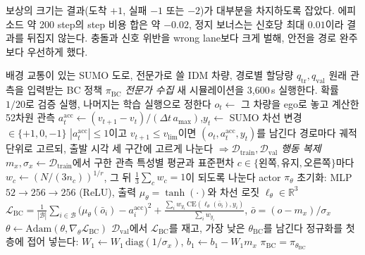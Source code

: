 \documentclass[10pt,a4paper]{article}
\newcommand{\Dtr}{\mathcal{D}_{\mathrm{train}}}
\newcommand{\Dval}{\mathcal{D}_{\mathrm{val}}}
\newcommand{\CE}{\mathrm{CE}}
\begin{document}
보상의 크기는 결과(도착 $+1$, 실패 $-1$ 또는 $-2$)가 대부분을 차지하도록 잡았다. 에피소드 약 200 step의 step 비용 합은 약 $-0.02$, 정지 보너스는 신호당 최대 $0.01$이라 결과를 뒤집지 않는다. 충돌과 신호 위반을 wrong lane보다 크게 벌해, 안전을 경로 완주보다 우선하게 했다.

\begin{algorithm}[t]
\caption{전문가 데이터 수집과 행동 복제(BC)}
\label{alg:bc-ko}
\begin{algorithmic}[1]
\Require 배경 교통이 있는 SUMO 도로, 전문가로 쓸 IDM 차량, 경로별 할당량 $q_{\mathrm{tr}}, q_{\mathrm{val}}$
\Ensure 원래 관측을 입력받는 BC 정책 $\pi_{\mathrm{BC}}$
\Statex \textit{전문가 수집}
\Repeat
  \State 새 시뮬레이션을 3{,}600\,s 실행한다. 확률 $1/20$로 검증 실행, 나머지는 학습 실행으로 정한다
    \State $o_t \gets$ 그 차량을 ego로 놓고 계산한 52차원 관측
    \State $a^{\mathrm{acc}}_t \gets (v_{t+1}-v_t)/(\Delta t\, a_{\max})$,\quad $y_t \gets$ SUMO 차선 변경 $\in\{+1,0,-1\}$
    \State $|a^{\mathrm{acc}}_t|\le 1$이고 $v_{t+1}\le v_{\mathrm{lim}}$이면 $(o_t, a^{\mathrm{acc}}_t, y_t)$를 남긴다
  \EndFor
{}
\State 경로마다 궤적 단위로 고르되, 출발 시각 세 구간에 고르게 나눈다 $\Rightarrow \Dtr, \Dval$
\Statex \textit{행동 복제}
\State $m_x, \sigma_x \gets \Dtr$에서 구한 관측 특성별 평균과 표준편차
\State $c\in\{\text{왼쪽},\text{유지},\text{오른쪽}\}$마다 $w_c \gets (N/(3 n_c))^{1/r}$, 그 뒤 $\tfrac13\sum_c w_c = 1$이 되도록 나눈다
\State actor $\pi_\theta$ 초기화: MLP $52\!\to\!256\!\to\!256$ (ReLU), 출력 $\mu_\theta=\tanh(\cdot)$와 차선 로짓 $\ell_\theta\in\mathbb{R}^3$
  \For{$\Dtr$의 크기 $B$ 미니배치 $\mathcal{B}$마다}
    \State $\displaystyle \mathcal{L}_{\mathrm{BC}} = \frac{1}{|\mathcal{B}|}\sum_{i\in\mathcal{B}}\big(\mu_\theta(\bar o_i)-a^{\mathrm{acc}}_i\big)^2
      + \frac{\sum_{i} w_{y_i}\,\CE(\ell_\theta(\bar o_i), y_i)}{\sum_{i} w_{y_i}}$, \quad $\bar o = (o-m_x)/\sigma_x$
    \State $\theta \gets \mathrm{Adam}(\theta, \nabla_\theta \mathcal{L}_{\mathrm{BC}})$ 
  \EndFor
  \State $\Dval$에서 $\mathcal{L}_{\mathrm{BC}}$를 재고, 가장 낮은 $\theta_{\mathrm{BC}}$를 남긴다
\EndFor
\State 정규화를 첫 층에 접어 넣는다: $W_1 \gets W_1\,\mathrm{diag}(1/\sigma_x)$, $b_1 \gets b_1 - W_1 m_x$
\State \Return $\pi_{\mathrm{BC}} = \pi_{\theta_{\mathrm{BC}}}$
\end{algorithmic}
\end{algorithm}
\end{document}
